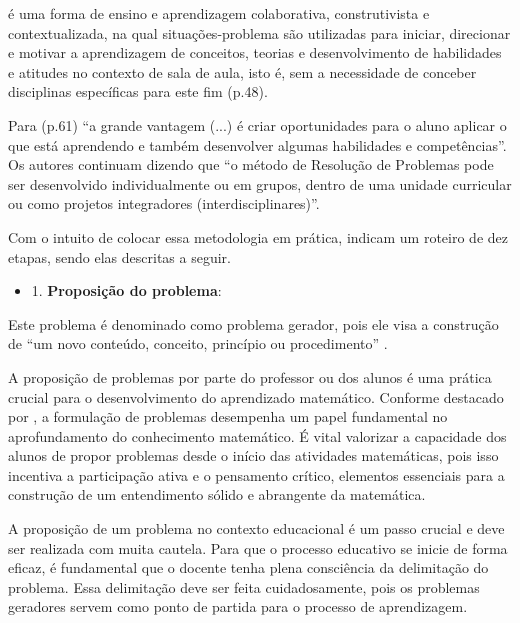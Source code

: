 \begin{citacao}
    é uma forma de ensino e aprendizagem colaborativa, construtivista e contextualizada, na qual situações-problema são utilizadas para iniciar, direcionar e motivar a aprendizagem de conceitos, teorias e desenvolvimento de habilidades e atitudes no contexto de sala de aula, isto é, sem a necessidade de conceber disciplinas específicas para este fim \cite{SOUZA2016} (p.48).
\end{citacao}

Para  (p.61) ``a grande vantagem (...) é criar oportunidades para o aluno aplicar o que está aprendendo e também desenvolver algumas habilidades e competências''. Os autores continuam dizendo que ``o método de Resolução de Problemas pode ser desenvolvido individualmente ou em grupos, dentro de uma unidade curricular ou como projetos integradores (interdisciplinares)''.

Com o intuito de colocar essa metodologia em prática,  indicam um roteiro de dez etapas, sendo elas descritas a seguir.


\begin{itemize}
    \item 1. \textbf{Proposição do problema}:
\end{itemize}

Este problema é denominado como problema gerador, pois ele visa a construção de ``um novo conteúdo, conceito, princípio ou procedimento'' \cite{resolucaoDeProblemas2019}.

A proposição de problemas por parte do professor ou dos alunos é uma prática crucial para o desenvolvimento do aprendizado matemático. Conforme destacado por \cite{CAI-etal2015}, a formulação de problemas desempenha um papel fundamental no aprofundamento do conhecimento matemático. É vital valorizar a capacidade dos alunos de propor problemas desde o início das atividades matemáticas, pois isso incentiva a participação ativa e o pensamento crítico, elementos essenciais para a construção de um entendimento sólido e abrangente da matemática.

A proposição de um problema no contexto educacional é um passo crucial e deve ser realizada com muita cautela. Para que o processo educativo se inicie de forma eficaz, é fundamental que o docente tenha plena consciência da delimitação do problema. Essa delimitação deve ser feita cuidadosamente, pois os problemas geradores servem como ponto de partida para o processo de aprendizagem.

